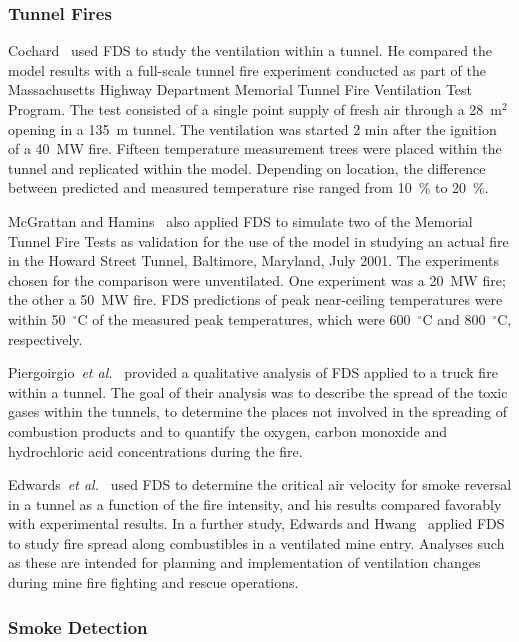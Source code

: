 \subsubsection{Tunnel Fires}

Cochard~\cite{Cochard:1} used  FDS to  study the ventilation  within a tunnel. He  compared the model  results with a full-scale  tunnel fire
experiment conducted  as part of the  Massachusetts Highway Department Memorial Tunnel Fire Ventilation  Test Program.  The test consisted of a
single  point supply of  fresh air through  a 28~m$^2$ opening  in a 135~m tunnel.  The ventilation was started 2 min after the ignition of a  40~MW
fire.  Fifteen  temperature  measurement  trees were  placed within  the  tunnel and  replicated  within  the  model. Depending  on location,  the
difference between  predicted and  measured temperature rise ranged from 10~\% to 20~\%.

McGrattan and Hamins~\cite{McGrattan:HST} also applied FDS to simulate two of the Memorial Tunnel Fire Tests as validation for the use of the model
in  studying  an  actual  fire in  the  Howard  Street  Tunnel, Baltimore,  Maryland,  July  2001.  The  experiments  chosen  for  the comparison
were unventilated. One  experiment was  a 20~MW  fire; the other a 50~MW fire.  FDS predictions of peak near-ceiling temperatures were within
50~$^\circ$C of the measured peak temperatures, which were 600~$^\circ$C and 800~$^\circ$C, respectively.

Piergoirgio~{\em  et al.}~\cite{Piergiorgio:1} provided  a qualitative analysis of FDS applied to a  truck fire within a tunnel.  The goal of their
analysis  was to describe the  spread of the  toxic gases within the tunnels, to determine the  places not involved in the spreading of combustion
products  and to quantify  the oxygen, carbon  monoxide and hydrochloric acid concentrations during the fire.

Edwards~{\em  et al.}~\cite{Edwards:SME2005,Edwards:FSJ}  used  FDS to determine the critical air velocity  for smoke reversal in a tunnel as a
function of  the fire intensity, and his  results compared favorably with   experimental  results.   In  a   further  study,   Edwards  and
Hwang~\cite{Edwards:SME2006}  applied FDS to  study fire  spread along combustibles in  a ventilated mine  entry. Analyses such as  these are
intended for planning and implementation of ventilation changes during mine fire fighting and rescue operations.




\subsubsection{Smoke Detection}

